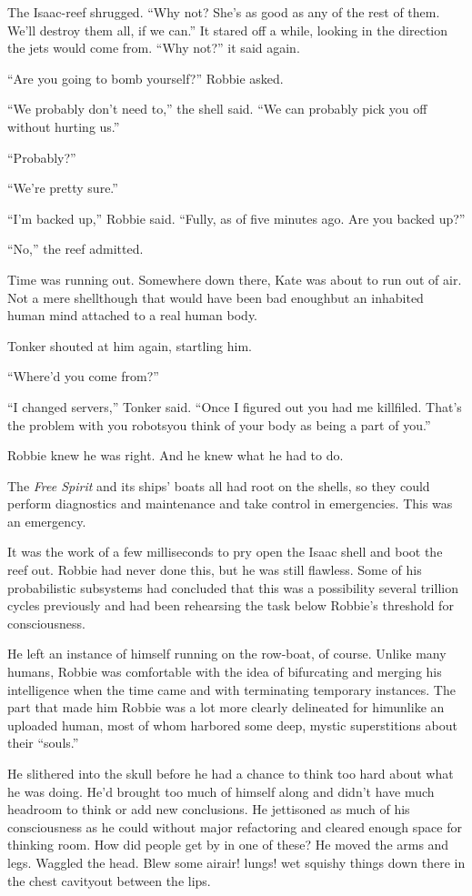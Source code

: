 The Isaac-reef shrugged. “Why not? She’s as good as any of the rest
of them. We’ll destroy them all, if we can.” It stared off a while,
looking in the direction the jets would come from. “Why not?” it
said again.

“Are you going to bomb yourself?” Robbie asked.

“We probably don’t need to,” the shell said. “We can probably pick
you off without hurting us.”

“Probably?”

“We’re pretty sure.”

“I’m backed up,” Robbie said. “Fully, as of five minutes ago. Are
you backed up?”

“No,” the reef admitted.

Time was running out. Somewhere down there, Kate was about to run
out of air. Not a mere shell\dash{}though that would have been bad
enough\dash{}but an inhabited human mind attached to a real human body.

Tonker shouted at him again, startling him.

“Where’d you come from?”

“I changed servers,” Tonker said. “Once I figured out you had me
killfiled. That’s the problem with you robots\dash{}you think of your
body as being a part of you.”

Robbie knew he was right. And he knew what he had to do.

The \emph{Free Spirit} and its ships’ boats all had root on the
shells, so they could perform diagnostics and maintenance and take
control in emergencies. This was an emergency.

It was the work of a few milliseconds to pry open the Isaac shell
and boot the reef out. Robbie had never done this, but he was still
flawless. Some of his probabilistic subsystems had concluded that
this was a possibility several trillion cycles previously and had
been rehearsing the task below Robbie’s threshold for
consciousness.

He left an instance of himself running on the row-boat, of course.
Unlike many humans, Robbie was comfortable with the idea of
bifurcating and merging his intelligence when the time came and
with terminating temporary instances. The part that made him Robbie
was a lot more clearly delineated for him\dash{}unlike an uploaded human,
most of whom harbored some deep, mystic superstitions about their
“souls.”

He slithered into the skull before he had a chance to think too
hard about what he was doing. He’d brought too much of himself
along and didn’t have much headroom to think or add new
conclusions. He jettisoned as much of his consciousness as he could
without major refactoring and cleared enough space for thinking
room. How did people get by in one of these? He moved the arms and
legs. Waggled the head. Blew some air\dash{}air! lungs! wet squishy
things down there in the chest cavity\dash{}out between the lips.

